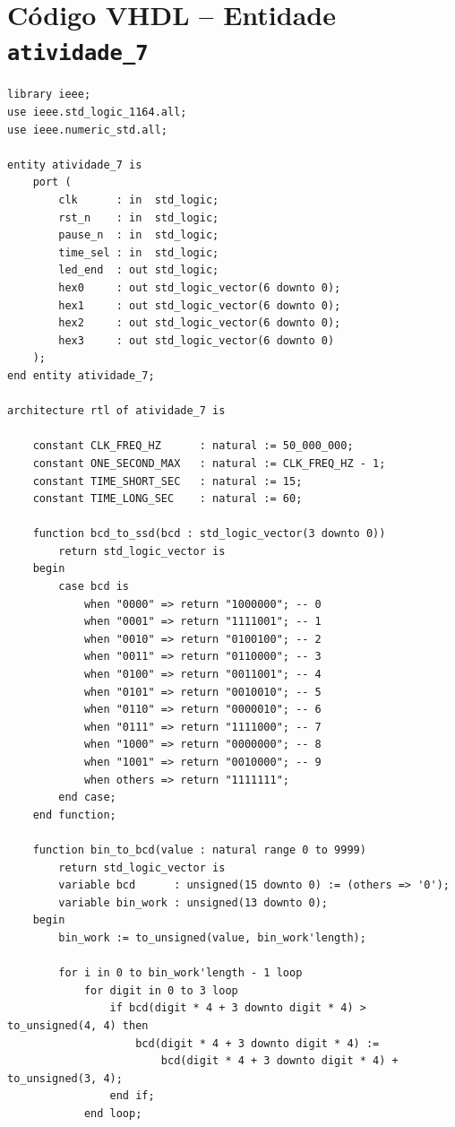 \documentclass[12pt,a4paper, brazil]{article}
\begin{document}
\appendix

\newpage
\section{Código VHDL -- Entidade \texttt{atividade\_7}}
\label{ap:codigo-top}

\begin{lstlisting}[style=vhdl, caption={Arquivo \texttt{atividade\_7.vhd}.}]
library ieee;
use ieee.std_logic_1164.all;
use ieee.numeric_std.all;

entity atividade_7 is
    port (
        clk      : in  std_logic;
        rst_n    : in  std_logic;
        pause_n  : in  std_logic;
        time_sel : in  std_logic;
        led_end  : out std_logic;
        hex0     : out std_logic_vector(6 downto 0);
        hex1     : out std_logic_vector(6 downto 0);
        hex2     : out std_logic_vector(6 downto 0);
        hex3     : out std_logic_vector(6 downto 0)
    );
end entity atividade_7;

architecture rtl of atividade_7 is

    constant CLK_FREQ_HZ      : natural := 50_000_000;
    constant ONE_SECOND_MAX   : natural := CLK_FREQ_HZ - 1;
    constant TIME_SHORT_SEC   : natural := 15;
    constant TIME_LONG_SEC    : natural := 60;

    function bcd_to_ssd(bcd : std_logic_vector(3 downto 0))
        return std_logic_vector is
    begin
        case bcd is
            when "0000" => return "1000000"; -- 0
            when "0001" => return "1111001"; -- 1
            when "0010" => return "0100100"; -- 2
            when "0011" => return "0110000"; -- 3
            when "0100" => return "0011001"; -- 4
            when "0101" => return "0010010"; -- 5
            when "0110" => return "0000010"; -- 6
            when "0111" => return "1111000"; -- 7
            when "1000" => return "0000000"; -- 8
            when "1001" => return "0010000"; -- 9
            when others => return "1111111";
        end case;
    end function;

    function bin_to_bcd(value : natural range 0 to 9999)
        return std_logic_vector is
        variable bcd      : unsigned(15 downto 0) := (others => '0');
        variable bin_work : unsigned(13 downto 0);
    begin
        bin_work := to_unsigned(value, bin_work'length);

        for i in 0 to bin_work'length - 1 loop
            for digit in 0 to 3 loop
                if bcd(digit * 4 + 3 downto digit * 4) > to_unsigned(4, 4) then
                    bcd(digit * 4 + 3 downto digit * 4) :=
                        bcd(digit * 4 + 3 downto digit * 4) + to_unsigned(3, 4);
                end if;
            end loop;


\end{lstlisting}
\end{document}
